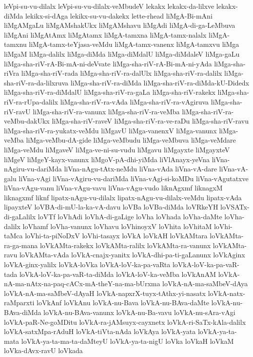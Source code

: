 {leVpi-su-vu-dilalx
leVpi-su-vu-dilalx-veMbudeV
lekakx
lekakx-da-lilxve
lekakx-diMda
lekikx-si-dAga
lekikx-su-vu-dakekx
lette-rhead
liMgA-Bi-mAni
liMgAMgaLu
liMgAMshakUkx
liMgAMshavu
liMgAdi
liMgA-di-ga-LeMbuva
liMgAni
liMgAtAmx
liMgAtamx
liMgA-tamxna
liMgA-tamx-nalalx
liMgA-tamxnu
liMgA-tamx-teYjasa-veMdu
liMgA-tamx-vanenx
liMgA-tamxvu
liMga
liMgaM
liMga-dalilx
liMga-diMda
liMga-diMdalU
liMga-diMdaleV
liMga-gaLu
liMga-sha-riV-rA-Bi-mA-ni-deVvate
liMga-sha-riV-rA-Bi-mA-ni-yAda
liMga-sha-riVra
liMga-sha-riV-rada
liMga-sha-riV-ra-dalUlx
liMga-sha-riV-ra-dalilx
liMga-sha-riV-ra-da-lilxruva
liMga-sha-riV-ra-diMda
liMga-sha-riV-ra-diMda-kU-Didedx
liMga-sha-riV-ra-diMdalU
liMga-sha-riV-ra-gaLa
liMga-sha-riV-rakekx
liMga-sha-riV-ra-rUpa-dalilx
liMga-sha-riV-ra-vAda
liMga-sha-riV-ra-vAgiruva
liMga-sha-riV-ravU
liMga-sha-riV-ra-vanunx
liMga-sha-riV-ra-veMba
liMga-sha-riV-ra-veMbu-dakUkx
liMga-sha-riV-raveV
liMga-sha-riV-ra-ve-raDu
liMga-sha-riV-ravu
liMga-sha-riV-ra-yukatx-veMdu
liMgavU
liMga-vanenxV
liMga-vanunx
liMga-veMba
liMga-veMbu-dA-gide
liMga-veMbudu
liMga-veMbuva
liMga-veMdare
liMga-veMdu
liMgaveV
liMga-ve-ni-su-vudu
liMgavu
liMgayxte
liMgayxteV
liMgeV
liMgeY-kayx-vanunx
liMgoV-pA-dhi-yiMda
liVlAnayx-yeVna
liVna-nAgiru-vu-dariMda
liVna-nAgu-tAtx-neMdu
liVna-vAda
liVna-vA-dare
liVna-vA-galu
liVna-vAgi
liVna-vAgiru-vu-dariMda
liVna-vAgi-si-koMDu
liVna-vAgutatxve
liVna-vAgu-vanu
liVna-vAgu-vavu
liVna-vAgu-vudo
liknAgxmf
liknagxM
liknagxmf
liknf
lipatx-nAgu-vu-dilalx
lipatx-nAgu-vu-dilalx-veMdu
lipatx-vAda
lipayxteV
loVBA-di-mU-la-ka-vA-davu
loVBa
loVBa-diMda
loVRkeYH
loVSATx-di-gaLalilx
loVTf
loVhAdi
loVhA-di-gaLige
loVha
loVhada
loVha-daMte
loVha-dalilx
loVhamf
loVha-vanunx
loVhavu
loVhinoyxV
loVhita
loVhitaM
loVhi-taMca
loVhi-ta-piNoDxV
loVhi-tasayx
loVkA
loVkAH
loVkAMtara
loVkAMta-ra-ga-mana
loVkAMta-rakekx
loVkAMta-ralilx
loVkAMta-ra-vanunx
loVkAMta-ravu
loVkAMta-vAda
loVkA-cnajx-yanitx
loVkA-dhi-pa-ti-gaLanunx
loVkAginx
loVkA-ginx-yalilx
loVkA-loVka
loVkA-loV-ka-pa-vaRta
loVkA-loV-ka-pa-vaR-tada
loVkA-loV-ka-pa-vaR-ta-diMda
loVkA-loV-ka-veMba
loVkAnAM
loVkA-nA-ma-nAtx-na-paq-cACx-mA-theY-na-ma-bUrxma
loVkA-nA-ma-saMbeV-dAya
loVkA-nA-ma-saMbeV-dAyaH
loVkA-napxrX-tuyx-tAthx-yi-nasatx
loVkA-natx-raMparxti
loVkAnf
loVkAnu
loVkA-nu-Bava
loVkA-nu-BAva-daMte
loVkA-nu-BAva-diMda
loVkA-nu-BAva-vanunx
loVkA-nu-Ba-vavu
loVkA-nu-sAra-vAgi
loVkA-paR-Ne-goMDitu
loVkA-ra-jAMsuyx-cayxnetx
loVkA-ri-SaTx-kAla-dalilx
loVkA-satxMpa-rAduH
loVkA-tiVta-nAda
loVkAya
loVkA-yata
loVkA-ya-ta-mata
loVkA-ya-ta-ma-ta-daMteyU
loVkA-ya-ta-nigU
loVka
loVkaH
loVkaM
loVka-dAvx-ravU
loVkada
}
